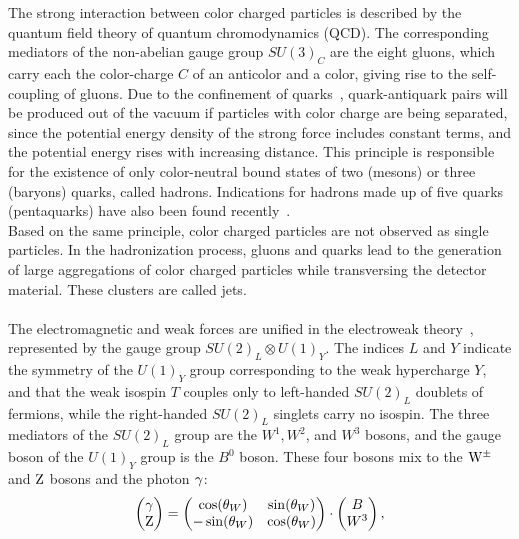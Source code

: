 The strong interaction between color charged particles is described by the quantum field theory of quantum chromodynamics (QCD). The corresponding mediators of the non-abelian gauge group $SU(3)_C$ are the eight gluons, which carry each the color-charge $C$ of an anticolor and a color, giving rise to the self-coupling of gluons. Due to the confinement of quarks~\cite{Confinement}, quark-antiquark pairs will be produced out of the vacuum if particles with color charge are being separated, since the potential energy density of the strong force includes constant terms, and the potential energy rises with increasing distance. This principle is responsible for the existence of only color-neutral bound states of two (mesons) or three (baryons) quarks, called hadrons. Indications for hadrons made up of five quarks (pentaquarks) have also been found recently~\cite{Pentaquarks}.\\
Based on the same principle, color charged particles are not observed as single particles. In the hadronization process, gluons and quarks lead to the generation of large aggregations of color charged particles while transversing the detector material. These clusters are called jets.
\\\\
The electromagnetic and weak forces are unified in the electroweak theory~\cite{Weinberg,Weinberg2,Salam,Glashow}, represented by the gauge group $ SU(2)_L\otimes U(1)_Y$. The indices $L$ and $Y$ indicate the symmetry of the $U(1)_Y$ group corresponding to the weak hypercharge $Y$, and that the weak isospin $T$ couples only to left-handed $SU(2)_L$ doublets of fermions, while the right-handed $SU(2)_L$ singlets carry no isospin. The three mediators of the $SU(2)_L$ group are the $W^1,W^2$, and $W^3$ bosons, and the gauge boson of the $U(1)_Y$ group is the $B^0$ boson.
These four bosons mix to the $\mathrm{W}^\pm$ and $\mathrm{Z}$ bosons and the photon $\gamma$:
\begin{equation}
 \left(
 \begin{matrix}
  \gamma \\
  \mathrm{Z}
 \end{matrix}
 \right)
 =
 \left(\begin{matrix}
  \cos(\theta_W)  & \sin(\theta_W) \\
  -\sin(\theta_W) & \cos(\theta_W) 
 \end{matrix}\right)
 \cdot
 \left(
 \begin{matrix}
  B \\
  W^3
 \end{matrix}
 \right),
\end{equation}

